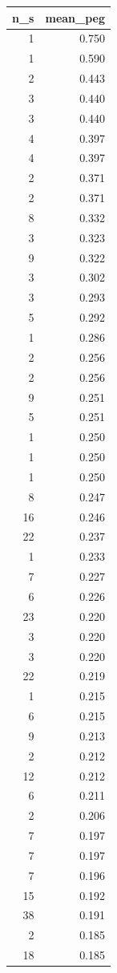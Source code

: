 \begin{tabular}{rr}
\toprule
n_s & mean_peg \\
\midrule
1 & 0.750 \\
1 & 0.590 \\
2 & 0.443 \\
3 & 0.440 \\
3 & 0.440 \\
4 & 0.397 \\
4 & 0.397 \\
2 & 0.371 \\
2 & 0.371 \\
8 & 0.332 \\
3 & 0.323 \\
9 & 0.322 \\
3 & 0.302 \\
3 & 0.293 \\
5 & 0.292 \\
1 & 0.286 \\
2 & 0.256 \\
2 & 0.256 \\
9 & 0.251 \\
5 & 0.251 \\
1 & 0.250 \\
1 & 0.250 \\
1 & 0.250 \\
8 & 0.247 \\
16 & 0.246 \\
22 & 0.237 \\
1 & 0.233 \\
7 & 0.227 \\
6 & 0.226 \\
23 & 0.220 \\
3 & 0.220 \\
3 & 0.220 \\
22 & 0.219 \\
1 & 0.215 \\
6 & 0.215 \\
9 & 0.213 \\
2 & 0.212 \\
12 & 0.212 \\
6 & 0.211 \\
2 & 0.206 \\
7 & 0.197 \\
7 & 0.197 \\
7 & 0.196 \\
15 & 0.192 \\
38 & 0.191 \\
2 & 0.185 \\
18 & 0.185 \\

\end{tabular}
